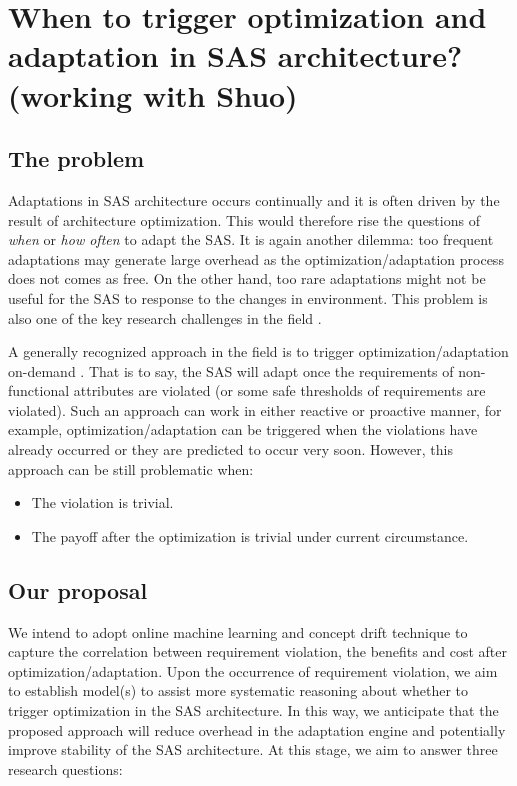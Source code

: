 \documentclass[DIV15,a4paper]{scrartcl}
\begin{document}
\section{When to trigger optimization and adaptation in SAS architecture? (working with Shuo)}

\subsection{The problem}

Adaptations in SAS architecture occurs continually and it is often driven by the result of architecture optimization. This would therefore rise the questions of \emph{when} or \emph{how often} to adapt the SAS. It is again another dilemma: too frequent adaptations may generate large overhead as the optimization/adaptation process does not comes as free. On the other hand, too rare adaptations might not be useful for the SAS to response to the changes in environment. This problem is also one of the key research challenges in the field \cite{Brun2013}.


A generally recognized approach in the field is to trigger optimization/adaptation on-demand \cite{Elkhodary:2010}\cite{Esfahani:2011}. That is to say, the SAS will adapt once the requirements of non-functional attributes are violated (or some safe thresholds of requirements are violated). Such an approach can work in either reactive or proactive manner, for example, optimization/adaptation can be triggered when the violations have already occurred or they are predicted to occur very soon. However, this approach can be still problematic when:

\begin{itemize}

\item The violation is trivial.

\item The payoff after the optimization is trivial under current circumstance.

\end{itemize}

\subsection{Our proposal}

We intend to adopt online machine learning and concept drift technique to capture the correlation between requirement violation, the benefits and cost after optimization/adaptation. Upon the occurrence of requirement violation, we aim to establish model(s) to assist more systematic reasoning about whether to trigger optimization in the SAS architecture. In this way, we anticipate that the proposed approach will reduce overhead in the adaptation engine and potentially improve stability of the SAS architecture. At this stage, we aim to answer three research questions:
\end{document}
